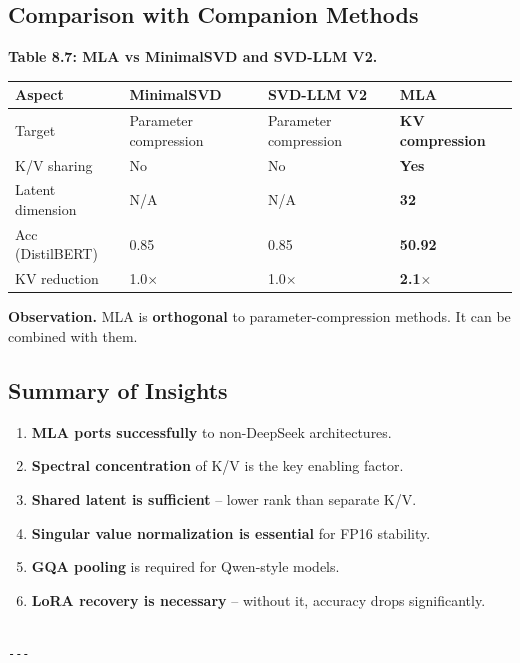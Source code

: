 \subsection{Comparison with Companion Methods}

\textbf{Table 8.7: MLA vs MinimalSVD and SVD-LLM V2.}

\begin{table}[H]
\centering
\small
\begin{tabular}{llll}
\toprule
\textbf{Aspect} & \textbf{MinimalSVD} & \textbf{SVD-LLM V2} & \textbf{MLA} \\
\midrule
Target & Parameter compression & Parameter compression & \textbf{KV compression} \\
K/V sharing & No & No & \textbf{Yes} \\
Latent dimension & N/A & N/A & \textbf{32} \\
Acc (DistilBERT) & 0.85 & 0.85 & \textbf{50.92} \\
KV reduction & 1.0$\times$ & 1.0$\times$ & \textbf{2.1$\times$} \\
\bottomrule
\end{tabular}
\end{table}

\textbf{Observation.} MLA is \textbf{orthogonal} to parameter-compression methods. It 
can be combined with them.

\subsection{Summary of Insights}

\begin{enumerate}
\item \textbf{MLA ports successfully} to non-DeepSeek architectures.
\item \textbf{Spectral concentration} of K/V is the key enabling factor.
\item \textbf{Shared latent is sufficient} -- lower rank than separate K/V.
\item \textbf{Singular value normalization is essential} for FP16 stability.
\item \textbf{GQA pooling} is required for Qwen-style models.
\item \textbf{LoRA recovery is necessary} -- without it, accuracy drops
  significantly.
\end{enumerate}
\begin{lstlisting}

---
\end{lstlisting}
